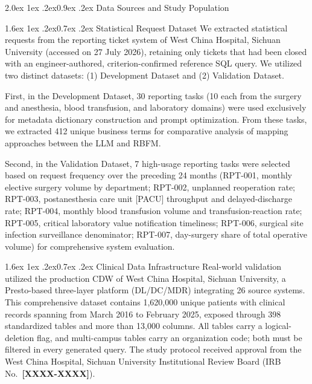 \documentclass[10pt]{article}
\makeatletter
\renewcommand\subsection{\@startsection{subsection}{2}{\z@}%
  {2.0ex \@plus 1ex \@minus .2ex}{0.9ex \@plus .2ex}%
  {\normalfont\normalsize\bfseries}}
\renewcommand\subsubsection{\@startsection{subsubsection}{3}{\z@}%
  {1.6ex \@plus 1ex \@minus .2ex}{0.7ex \@plus .2ex}%
  {\normalfont\normalsize\itshape}}
\newcommand{\PH}[1]{{\color{red}\textbf{[#1]}}}
\makeatother
\begin{document}
\subsection{Data Sources and Study Population}

\subsubsection{Statistical Request Dataset}
We extracted statistical requests from the reporting ticket system of
West China Hospital, Sichuan University (accessed on 27 July 2026), retaining only tickets that had been
closed with an engineer-authored, criterion-confirmed reference SQL query. We
utilized two distinct datasets: (1) Development Dataset and (2) Validation
Dataset.

First, in the Development Dataset, 30 reporting tasks (10 each from the surgery
and anesthesia, blood transfusion, and laboratory domains) were used exclusively
for metadata dictionary construction and prompt optimization. From these tasks,
we extracted 412 unique business terms for comparative analysis of mapping
approaches between the LLM and RBFM.

Second, in the Validation Dataset, 7 high-usage reporting tasks were selected
based on request frequency over the preceding 24 months (RPT-001, monthly
elective surgery volume by department; RPT-002, unplanned reoperation rate;
RPT-003, postanesthesia care unit [PACU] throughput and delayed-discharge rate;
RPT-004, monthly blood transfusion volume and transfusion-reaction rate;
RPT-005, critical laboratory value notification timeliness; RPT-006, surgical
site infection surveillance denominator; RPT-007, day-surgery share of total
operative volume) for comprehensive system evaluation.

\subsubsection{Clinical Data Infrastructure}
Real-world validation utilized the production CDW of West China Hospital, Sichuan University, a
Presto-based three-layer platform (DL/DC/MDR) integrating 26 source
systems. This comprehensive dataset contains 1,620,000 unique patients with
clinical records spanning from March 2016 to February 2025, exposed
through 398 standardized tables and more than 13,000 columns. All tables
carry a logical-deletion flag, and multi-campus tables carry an organization
code; both must be filtered in every generated query. The study protocol
received approval from the West China Hospital, Sichuan University Institutional Review Board (IRB
No.\ \PH{XXXX-XXXX}).
\end{document}
